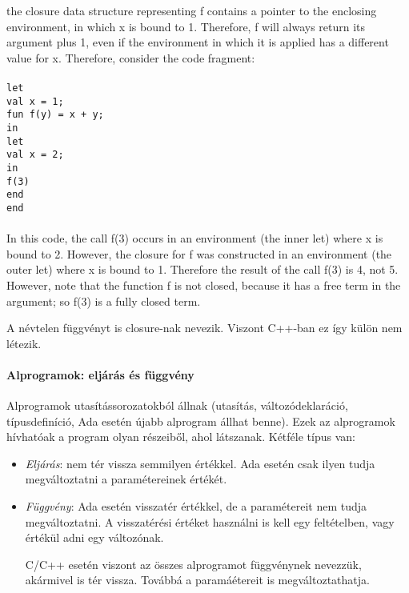 \documentclass[fleqn,10pt,a4paper]{article}
\newcommand{\ut}[1]{\texttt{#1}}
\theoremstyle{magyar}
\begin{document}
  the closure data structure representing f contains a pointer to the
  enclosing environment, in which x is bound to 1. Therefore, f will
  always return its argument plus 1, even if the environment in which
  it is applied has a different value for x. Therefore, consider the
  code fragment:\\
  \ut{\\    
    let\\
    \hspace*{0.5em}val x = 1;\\
    \hspace*{.5em}fun f(y) = x + y;\\
    in\\
    \hspace*{.5em}let\\
    \hspace*{1em}val x = 2;\\
    \hspace*{.5em}in\\
    \hspace*{1em}f(3)\\
    \hspace*{.5em}end\\
    end\\\\
  }
  In this code, the call f(3) occurs in an environment (the inner let)
  where x is bound to 2. However, the closure for f was constructed in
  an environment (the outer let) where x is bound to 1. Therefore the
  result of the call f(3) is 4, not 5. However, note that the function f
  is not closed, because it has a free term in the argument; so f(3) is
  a fully closed term.

  A névtelen függvényt is closure-nak nevezik. Viszont C++-ban ez így
  külön nem létezik.

  \paragraph{Alprogramok: eljárás és függvény}
  Alprogramok utasítássorozatokból állnak (utasítás,
  változódeklaráció, típusdefiníció, Ada esetén újabb alprogram állhat
  benne). Ezek az alprogramok hívhatóak a program olyan részeiből,
  ahol látszanak. Kétféle típus van:
  \begin{itemize}
    \item \emph{Eljárás}: nem tér vissza semmilyen értékkel. Ada
      esetén csak ilyen tudja megváltoztatni a paramétereinek értékét.
    \item \emph{Függvény}: Ada esetén visszatér értékkel, de a
      paramétereit nem tudja megváltoztatni. A visszatérési értéket
      használni is kell egy feltételben, vagy értékül adni egy
      változónak.

      C/C++ esetén viszont az
      összes alprogramot függvénynek nevezzük, akármivel is tér
      vissza. Továbbá a paramáétereit is megváltoztathatja.
  \end{itemize}
\end{document}
